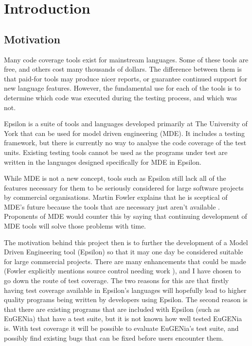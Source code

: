 \chapter{Introduction}

\section{Motivation}

Many code coverage tools exist for mainstream languages. Some of these tools are free, and others cost many thousands of dollars. The difference between them is that paid-for tools may produce nicer reports, or guarantee continued support for new language features. However, the fundamental use for each of the tools is to determine which code was executed during the testing process, and which was not.

Epsilon is a suite of tools and languages developed primarily at The University of York that can be used for model driven engineering (MDE). It includes a testing framework, but there is currently no way to analyse the code coverage of the test units. Existing testing tools cannot be used as the programs under test are written in the languages designed specifically for MDE in Epsilon.

While MDE is not a new concept, tools such as Epsilon still lack all of the features necessary for them to be seriously considered for large software projects by commercial organisations. Martin Fowler explains that he is sceptical of MDE's future because the tools that are necessary just aren't available \cite{fowlerMDE}. Proponents of MDE would counter this by saying that continuing development of MDE tools will solve those problems with time.

The motivation behind this project then is to further the development of a Model Driven Engineering tool (Epsilon) so that it may one day be considered suitable for large commercial projects. There are many enhancements that could be made (Fowler explicitly mentions source control needing work \cite{fowlerMDE}), and I have chosen to go down the route of test coverage. The two reasons for this are that firstly having test coverage available in Epsilon's languages will hopefully lead to higher quality programs being written by developers using Epsilon. The second reason is that there are existing programs that are included with Epsilon (such as EuGENia) that have a test suite, but it is not known how well tested EuGENia is. With test coverage it will be possible to evaluate EuGENia's test suite, and possibly find existing bugs that can be fixed before users encounter them.

